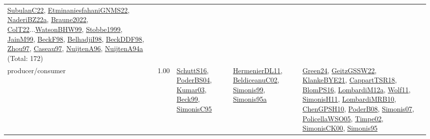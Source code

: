 {\begin{longtable}{p{3cm}r>{\raggedright\arraybackslash}p{6cm}>{\raggedright\arraybackslash}p{6cm}>{\raggedright\arraybackslash}p{8cm}}
\hyperref[detail:SubulanC22]{SubulanC22}, \hyperref[detail:EtminaniesfahaniGNMS22]{EtminaniesfahaniGNMS22}, \hyperref[detail:NaderiBZ22a]{NaderiBZ22a}, \hyperref[detail:Braune2022]{Braune2022}, \hyperref[detail:ColT22]{ColT22}...\hyperref[detail:WatsonBHW99]{WatsonBHW99}, \hyperref[detail:Stobbe1999]{Stobbe1999}, \hyperref[detail:JainM99]{JainM99}, \hyperref[detail:BeckF98]{BeckF98}, \hyperref[detail:BelhadjiI98]{BelhadjiI98}, \hyperref[detail:BeckDDF98]{BeckDDF98}, \hyperref[detail:Zhou97]{Zhou97}, \hyperref[detail:Caseau97]{Caseau97}, \hyperref[detail:NuijtenA96]{NuijtenA96}, \hyperref[detail:NuijtenA94a]{NuijtenA94a} (Total: 172)\\
\index{producer/consumer}\index{Concepts!producer/consumer}producer/consumer &  1.00 & \hyperref[detail:SchuttS16]{SchuttS16}, \hyperref[detail:PoderBS04]{PoderBS04}, \hyperref[detail:Kumar03]{Kumar03}, \hyperref[detail:Beck99]{Beck99}, \hyperref[detail:SimonisC95]{SimonisC95} & \hyperref[detail:HermenierDL11]{HermenierDL11}, \hyperref[detail:BeldiceanuC02]{BeldiceanuC02}, \hyperref[detail:Simonis99]{Simonis99}, \hyperref[detail:Simonis95a]{Simonis95a} & \hyperref[detail:Green24]{Green24}, \hyperref[detail:GeitzGSSW22]{GeitzGSSW22}, \hyperref[detail:KlankeBYE21]{KlankeBYE21}, \hyperref[detail:CappartTSR18]{CappartTSR18}, \hyperref[detail:BlomPS16]{BlomPS16}, \hyperref[detail:LombardiM12a]{LombardiM12a}, \hyperref[detail:Wolf11]{Wolf11}, \hyperref[detail:SimonisH11]{SimonisH11}, \hyperref[detail:LombardiMRB10]{LombardiMRB10}, \hyperref[detail:ChenGPSH10]{ChenGPSH10}, \hyperref[detail:PoderB08]{PoderB08}, \hyperref[detail:Simonis07]{Simonis07}, \hyperref[detail:PolicellaWSO05]{PolicellaWSO05}, \hyperref[detail:Timpe02]{Timpe02}, \hyperref[detail:SimonisCK00]{SimonisCK00}, \hyperref[detail:Simonis95]{Simonis95}\\

\end{longtable}}
